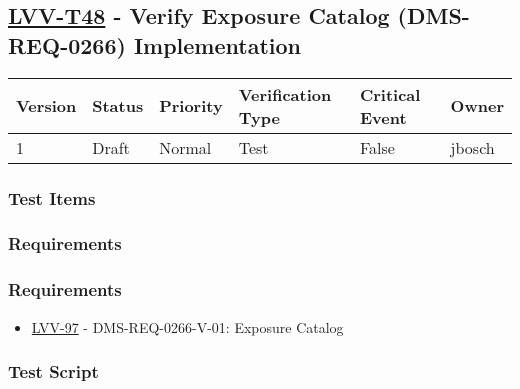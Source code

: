 \hypertarget{lvv-t48---verify-exposure-catalog-dms-req-0266-implementation}{%
\subsection{\texorpdfstring{\href{https://jira.lsstcorp.org/secure/Tests.jspa\#/testCase/LVV-T48}{LVV-T48}
- Verify Exposure Catalog (DMS-REQ-0266)
Implementation}{LVV-T48 - Verify Exposure Catalog (DMS-REQ-0266) Implementation}}\label{lvv-t48---verify-exposure-catalog-dms-req-0266-implementation}}

\begin{longtable}[]{@{}llllll@{}}
\toprule
Version & Status & Priority & Verification Type & Critical Event &
Owner\tabularnewline
\midrule
\endhead
1 & Draft & Normal & Test & False & jbosch\tabularnewline
\bottomrule
\end{longtable}

\hypertarget{test-items-18}{%
\subsubsection{Test Items}\label{test-items-18}}

\hypertarget{requirements-36}{%
\subsubsection{Requirements}\label{requirements-36}}

\hypertarget{requirements-37}{%
\subsubsection{Requirements}\label{requirements-37}}

\begin{itemize}
\tightlist
\item
  \href{https://jira.lsstcorp.org/browse/LVV-97}{LVV-97} -
  DMS-REQ-0266-V-01: Exposure Catalog
\end{itemize}

\hypertarget{test-script-18}{%
\subsubsection{Test Script}\label{test-script-18}}

